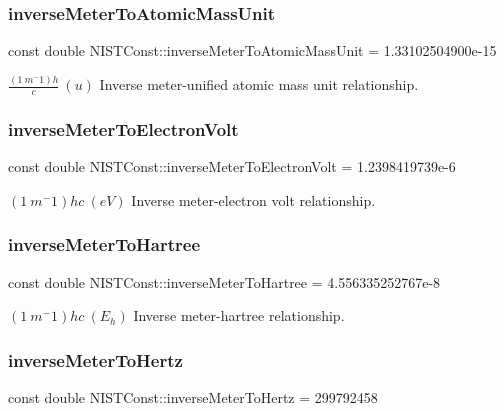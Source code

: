 \subsubsection{\texorpdfstring{inverse\+Meter\+To\+Atomic\+Mass\+Unit}{inverseMeterToAtomicMassUnit}}
{\footnotesize\ttfamily const double N\+I\+S\+T\+Const\+::inverse\+Meter\+To\+Atomic\+Mass\+Unit = 1.\+33102504900e-\/15}

$\frac{(1\ m^-1)h}{c} \ (u)$ Inverse meter-\/unified atomic mass unit relationship. \mbox{\label{group___n_i_s_t_const-_inverse_meter_gafdede27a7699d3a180bb829b65fac447}} 
\subsubsection{\texorpdfstring{inverse\+Meter\+To\+Electron\+Volt}{inverseMeterToElectronVolt}}
{\footnotesize\ttfamily const double N\+I\+S\+T\+Const\+::inverse\+Meter\+To\+Electron\+Volt = 1.\+2398419739e-\/6}

$(1\ m^-1)hc \ (eV)$ Inverse meter-\/electron volt relationship. \mbox{\label{group___n_i_s_t_const-_inverse_meter_ga6f47bdfe8997031b0f15229eb5bf4b9e}} 
\subsubsection{\texorpdfstring{inverse\+Meter\+To\+Hartree}{inverseMeterToHartree}}
{\footnotesize\ttfamily const double N\+I\+S\+T\+Const\+::inverse\+Meter\+To\+Hartree = 4.\+556335252767e-\/8}

$(1\ m^-1)hc \ (E_h)$ Inverse meter-\/hartree relationship. \mbox{\label{group___n_i_s_t_const-_inverse_meter_ga5743c27316774c4f065336d0a016508e}} 
\subsubsection{\texorpdfstring{inverse\+Meter\+To\+Hertz}{inverseMeterToHertz}}
{\footnotesize\ttfamily const double N\+I\+S\+T\+Const\+::inverse\+Meter\+To\+Hertz = 299792458}

